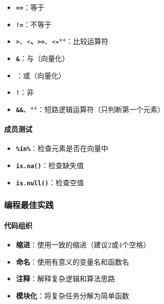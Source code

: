 \documentclass[
  twoside]{book}
\providecommand{\tightlist}{%
  \setlength{\itemsep}{0pt}\setlength{\parskip}{0pt}}
\begin{document}
\begin{itemize}
\tightlist
\item
  \textbf{\texttt{==}}：等于
\item
  \textbf{\texttt{!=}}：不等于
\item
  \textbf{\texttt{\textgreater{}}}、\texttt{\textless{}}\textbf{、\texttt{\textgreater{}=}}、\texttt{\textless{}=}**：比较运算符
\item
  \textbf{\texttt{\&}}：与（向量化）
\item
  \textbf{\texttt{\textbar{}}}：或（向量化）
\item
  \textbf{\texttt{!}}：非
\item
  \textbf{\texttt{\&\&}}、\texttt{\textbar{}\textbar{}}**：短路逻辑运算符（只判断第一个元素）
\end{itemize}

\hypertarget{ux6210ux5458ux6d4bux8bd5}{%
\paragraph{成员测试}\label{ux6210ux5458ux6d4bux8bd5}}

\begin{itemize}
\tightlist
\item
  \textbf{\texttt{\%in\%}}：检查元素是否在向量中
\item
  \textbf{\texttt{is.na()}}：检查缺失值
\item
  \textbf{\texttt{is.null()}}：检查空值
\end{itemize}

\hypertarget{ux7f16ux7a0bux6700ux4f73ux5b9eux8df5}{%
\subsubsection{编程最佳实践}\label{ux7f16ux7a0bux6700ux4f73ux5b9eux8df5}}

\hypertarget{ux4ee3ux7801ux7ec4ux7ec7}{%
\paragraph{代码组织}\label{ux4ee3ux7801ux7ec4ux7ec7}}

\begin{itemize}
\tightlist
\item
  \textbf{缩进}：使用一致的缩进（建议2或4个空格）
\item
  \textbf{命名}：使用有意义的变量名和函数名
\item
  \textbf{注释}：解释复杂逻辑和算法思路
\item
  \textbf{模块化}：将复杂任务分解为简单函数
\end{itemize}
\end{document}
